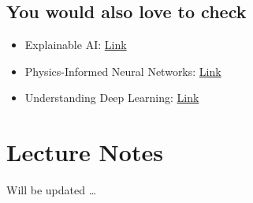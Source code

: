 \documentclass[
]{book}
\begin{document}
\hypertarget{you-would-also-love-to-check}{%
\section*{You would also love to check}\label{you-would-also-love-to-check}}

\begin{itemize}
\item
  Explainable AI: \href{https://youtube.com/playlist?list=PLV8yxwGOxvvovp-j6ztxhF3QcKXT6vORU\&si=7N_VPAK0OkqRGiIz}{Link}
\item
  Physics-Informed Neural Networks: \href{https://youtube.com/playlist?list=PLXmYoJbJ848pkMm9NGZZKXUQJ8XWIXZX8\&si=_AOgnC__wzOGc9xC}{Link}
\item
  Understanding Deep Learning: \href{https://github.com/udlbook/udlbook/tree/main}{Link}
\end{itemize}

\hypertarget{Lecture_Notes}{%
\chapter{Lecture Notes}\label{Lecture_Notes}}

Will be updated \ldots{}

  
\end{document}
